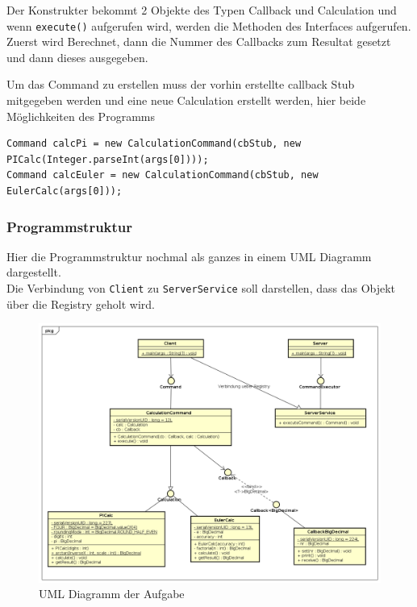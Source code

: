 Der Konstrukter bekommt 2 Objekte des Typen Callback und Calculation und wenn \texttt{execute()} aufgerufen wird, werden die Methoden des Interfaces aufgerufen.
Zuerst wird Berechnet, dann die Nummer des Callbacks zum Resultat gesetzt und dann dieses ausgegeben.

Um das Command zu erstellen muss der vorhin erstellte callback Stub mitgegeben werden und eine neue Calculation erstellt werden, hier beide M\"oglichkeiten des Programms

\begin{lstlisting}[style=Java, caption=Command Erstellung]
Command calcPi = new CalculationCommand(cbStub, new PICalc(Integer.parseInt(args[0])));
Command calcEuler = new CalculationCommand(cbStub, new EulerCalc(args[0]));
\end{lstlisting}

\subsubsection{Programmstruktur}

Hier die Programmstruktur nochmal als ganzes in einem UML Diagramm dargestellt.\\
Die Verbindung von \texttt{Client} zu \texttt{ServerService} soll darstellen, dass das Objekt \"uber die Registry geholt wird.

\begin{figure}[!h]
        \begin{center}
                \includegraphics[width=\linewidth]{images/commandPatternUML.png}
                \caption{UML Diagramm der Aufgabe}
        \end{center}
\end{figure}

